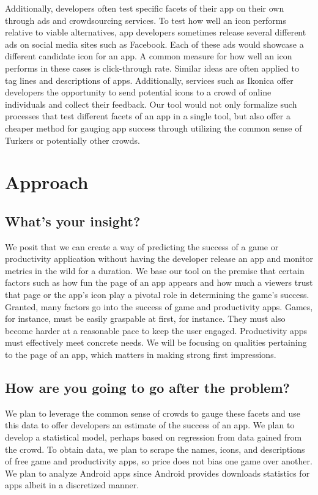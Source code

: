 \documentclass{article}
\begin{document}
Additionally, developers often test specific facets of their app on their own through ads and crowdsourcing services. To test how well an icon performs relative to viable alternatives, app developers sometimes release several different ads on social media sites such as Facebook. Each of these ads would showcase a different candidate icon for an app. A common measure for how well an icon performs in these cases is click-through rate. Similar ideas are often applied to tag lines and descriptions of apps. Additionally, services such as Ikonica offer developers the opportunity to send potential icons to a crowd of online individuals and collect their feedback. Our tool would not only formalize such processes that test different facets of an app in a single tool, but also offer a cheaper method for gauging app success through utilizing the common sense of Turkers or potentially other crowds.

\section{Approach}

\subsection{What’s your insight?}

We posit that we can create a way of predicting the success of a game or productivity application without having the developer release an app and monitor metrics in the wild for a duration. We base our tool on the premise that certain factors such as how fun the page of an app appears and how much a viewers trust that page or the app’s icon play a pivotal role in determining the game’s success. \\

Granted, many factors go into the success of game and productivity apps. Games, for instance, must be easily graspable at first, for instance. They must also become harder at a reasonable pace to keep the user engaged. Productivity apps must effectively meet concrete needs. We will be focusing on qualities pertaining to the page of an app, which matters in making strong first impressions.

\subsection{How are you going to go after the problem?}

We plan to leverage the common sense of crowds to gauge these facets and use this data to offer developers an estimate of the success of an app. We plan to develop a statistical model, perhaps based on regression from data gained from the crowd. To obtain data, we plan to scrape the names, icons, and descriptions of free game and productivity apps, so price does not bias one game over another. We plan to analyze Android apps since Android provides downloads statistics for apps albeit in a discretized manner. \\
\end{document}
